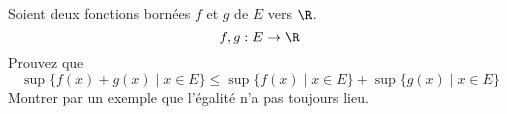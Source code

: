 
\begin{exercice}\label{exo0004}

Soient deux fonctions bornées $f$ et $g$ de $E$ vers $\R$.
\[
f,g : E \rightarrow \R
\]
Prouvez que
\[
\sup \{f(x)+g(x) \mid x\in E \} \leq \sup \{f(x) \mid x\in E \} + \sup \{ g(x) \mid x\in E \}
\]
Montrer par un exemple que l'égalité n'a pas toujours lieu.

\end{exercice}
